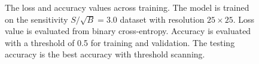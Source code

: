 \documentclass[12pt]{article}
\begin{document}
\begin{figure}[htpb]
{                }
                \caption{The loss and accuracy values across training. The model is trained on the sensitivity $S / \sqrt{B} = 3.0$ dataset with resolution $25\times 25$. Loss value is evaluated from binary cross-entropy. Accuracy is evaluated with a threshold of 0.5 for training and validation. The testing accuracy is the best accuracy with threshold scanning.}
                \label{fig:loss_acc_across_training_SB_3_res_25}
            \end{figure}
\end{document}
